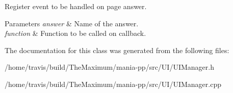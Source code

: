Register event to be handled on page answer. 


\begin{DoxyParams}{Parameters}
{\em answer} & Name of the answer. \\
\hline
{\em function} & Function to be called on callback. \\
\hline
\end{DoxyParams}


The documentation for this class was generated from the following files\-:\begin{DoxyCompactItemize}
\item 
/home/travis/build/\-The\-Maximum/mania-\/pp/src/\-U\-I/U\-I\-Manager.\-h\item 
/home/travis/build/\-The\-Maximum/mania-\/pp/src/\-U\-I/U\-I\-Manager.\-cpp\end{DoxyCompactItemize}
